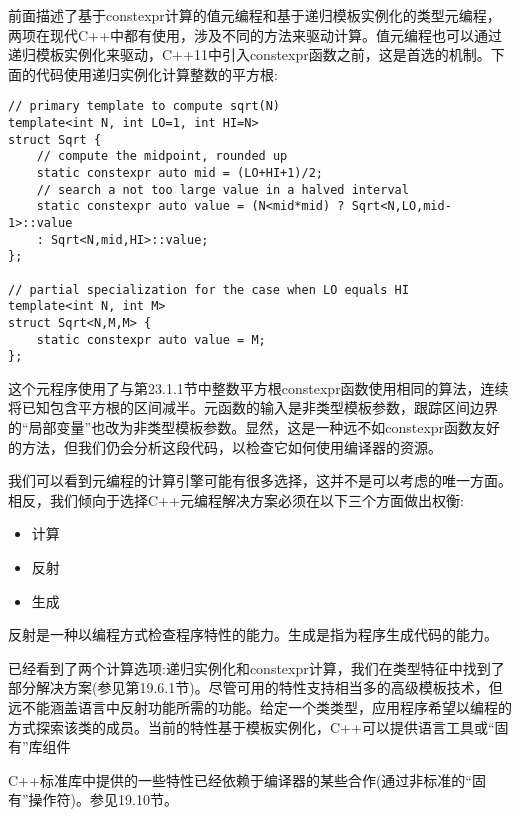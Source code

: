 前面描述了基于constexpr计算的值元编程和基于递归模板实例化的类型元编程，两项在现代C++中都有使用，涉及不同的方法来驱动计算。值元编程也可以通过递归模板实例化来驱动，C++11中引入constexpr函数之前，这是首选的机制。下面的代码使用递归实例化计算整数的平方根:

\begin{lstlisting}[style=styleCXX]
// primary template to compute sqrt(N)
template<int N, int LO=1, int HI=N>
struct Sqrt {
	// compute the midpoint, rounded up
	static constexpr auto mid = (LO+HI+1)/2;
	// search a not too large value in a halved interval
	static constexpr auto value = (N<mid*mid) ? Sqrt<N,LO,mid-1>::value
	: Sqrt<N,mid,HI>::value;
};

// partial specialization for the case when LO equals HI
template<int N, int M>
struct Sqrt<N,M,M> {
	static constexpr auto value = M;
};
\end{lstlisting}

这个元程序使用了与第23.1.1节中整数平方根constexpr函数使用相同的算法，连续将已知包含平方根的区间减半。元函数的输入是非类型模板参数，跟踪区间边界的“局部变量”也改为非类型模板参数。显然，这是一种远不如constexpr函数友好的方法，但我们仍会分析这段代码，以检查它如何使用编译器的资源。

我们可以看到元编程的计算引擎可能有很多选择，这并不是可以考虑的唯一方面。相反，我们倾向于选择C++元编程解决方案必须在以下三个方面做出权衡:

\begin{itemize}
\item 
计算

\item 
反射

\item 
生成
\end{itemize}

反射是一种以编程方式检查程序特性的能力。生成是指为程序生成代码的能力。

已经看到了两个计算选项:递归实例化和constexpr计算，我们在类型特征中找到了部分解决方案(参见第19.6.1节)。尽管可用的特性支持相当多的高级模板技术，但远不能涵盖语言中反射功能所需的功能。给定一个类类型，应用程序希望以编程的方式探索该类的成员。当前的特性基于模板实例化，C++可以提供语言工具或“固有”库组件

\begin{tcolorbox}[colback=webgreen!5!white,colframe=webgreen!75!black]
\hspace*{0.75cm}C++标准库中提供的一些特性已经依赖于编译器的某些合作(通过非标准的“固有”操作符)。参见19.10节。
\end{tcolorbox}

